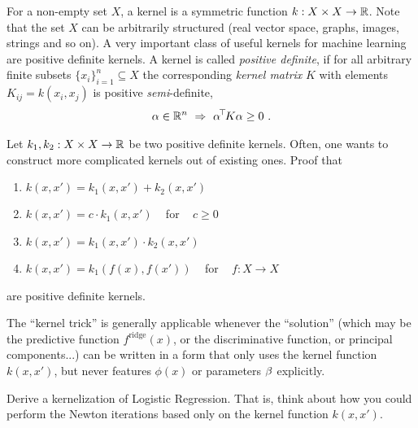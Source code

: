 



For a non-empty set $X$, a kernel is a symmetric function
$k: X \times X \to {\mathbb{R}}$. Note that the set
$X$ can be arbitrarily structured (real vector space, graphs,
images, strings and so on). A very important class of useful kernels
for machine learning are positive definite kernels. A kernel is
called \emph{positive definite}, if for all arbitrary finite subsets
$\{x_i\}_{i=1}^n \subseteq X$ the corresponding
\emph{kernel matrix} $K$ with elements $K_{ij} = k(x_i,x_j)$ is
positive \emph{semi}-definite,
\begin{align}
\alpha \in{\mathbb{R}}^n ~ \Rightarrow ~ \alpha^{\!\top\!} K\alpha \ge 0 ~.
\end{align}

Let $k_1,k_2: X\times X \to {\mathbb{R}}$ be two positive definite
kernels. Often, one wants to construct more complicated kernels out of
existing ones. Proof that
\begin{enumerate}
\item $k(x,x') = k_1(x,x') + k_2(x,x')$
\item $k(x,x') = c\cdot k_1(x,x')$ ~ for ~ $c \ge 0$
\item $k(x,x') = k_1(x,x') \cdot k_2(x,x')$
\item $k(x,x') = k_1(f(x),f(x'))$ ~ for ~ $f:X\to X$
\end{enumerate}
are positive definite kernels.



The ``kernel trick'' is generally applicable whenever the ``solution''
(which may be the predictive function $f^\text{ridge}(x)$, or the
discriminative function, or principal components...) can be written in
a form that only uses the kernel function $k(x,x')$, but never features
$\phi(x)$ or parameters $\beta$ explicitly.

Derive a kernelization of Logistic Regression. That is,
think about how you could perform the Newton iterations based only on
the kernel function $k(x,x')$.

